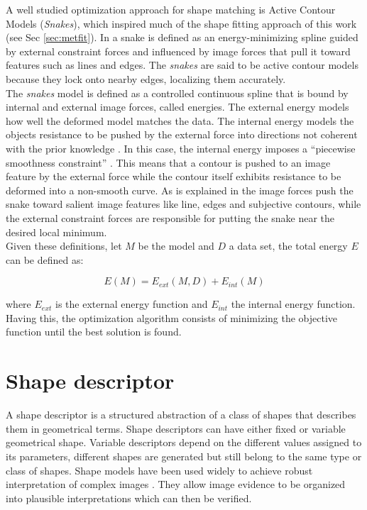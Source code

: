 A well studied optimization approach for shape matching is
Active Contour Models (\emph{Snakes}),  which inspired much 
of the shape fitting approach of this work 
(see Sec \ref{sec:metfit}). In \cite{snakes} a snake is defined 
as an energy-minimizing spline guided by external constraint
forces and influenced by image forces that pull it toward 
features such as lines and edges. The \emph{snakes} are said to
be active contour models because they lock onto nearby edges,
localizing them accurately.\\
The \emph{snakes} model is defined as a controlled continuous spline that is bound
by internal and external image forces, called energies. The external energy models how well
the deformed model matches the data. The internal energy models
the objects resistance to be pushed by the external force into directions not coherent
with the prior knowledge \cite{deformable}. In this case, the internal energy  imposes 
a ``piecewise smoothness constraint'' \cite{snakes}. This means that a contour is
pushed to an image feature by the external force while the contour itself exhibits resistance
to be deformed into a non-smooth curve. As is explained in \cite{deformable} the image forces push the snake toward
salient image features like line, edges and subjective contours, while the external constraint forces
are responsible for putting the snake near the desired local minimum.\\

Given these definitions, let $M$ be the model and $D$ a data set, 
the total energy $E$ can be defined as:

$$E(M) = E_{ext}(M,D) + E_{int}(M)$$

where $E_{ext}$ is the external energy function and $E_{int}$ the 
internal energy function. 
Having this, the optimization algorithm consists of minimizing the objective
function until the best solution is found.


\section{Shape descriptor}
\label{sec:shapedesc}

A shape descriptor is a structured abstraction of a class
of shapes that describes them in geometrical terms.
Shape descriptors can have either fixed or variable
geometrical shape. Variable descriptors depend on the different values assigned to its
parameters, different shapes are generated but still belong to the same type or class of shapes.
Shape models have been used widely to achieve robust interpretation of complex
images \cite{wormparam}. They allow image evidence to be organized into plausible interpretations
which can then be verified.\\

